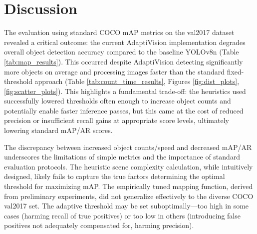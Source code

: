 \documentclass{article}
\begin{document}
\section{Discussion} \label{sec:discussion}
The evaluation using standard COCO mAP metrics on the val2017 dataset revealed a critical outcome: the current AdaptiVision implementation degrades overall object detection accuracy compared to the baseline YOLOv8n (Table \ref{tab:map_results}). This occurred despite AdaptiVision detecting significantly more objects on average and processing images faster than the standard fixed-threshold approach (Table \ref{tab:count_time_results}, Figures \ref{fig:dist_plots}, \ref{fig:scatter_plots}). This highlights a fundamental trade-off: the heuristics used successfully lowered thresholds often enough to increase object counts and potentially enable faster inference passes, but this came at the cost of reduced precision or insufficient recall gains at appropriate score levels, ultimately lowering standard mAP/AR scores.

The discrepancy between increased object counts/speed and decreased mAP/AR underscores the limitations of simple metrics and the importance of standard evaluation protocols. The heuristic scene complexity calculation, while intuitively designed, likely fails to capture the true factors determining the optimal threshold for maximizing mAP. The empirically tuned mapping function, derived from preliminary experiments, did not generalize effectively to the diverse COCO val2017 set. The adaptive threshold may be set suboptimally—too high in some cases (harming recall of true positives) or too low in others (introducing false positives not adequately compensated for, harming precision).
\end{document}
